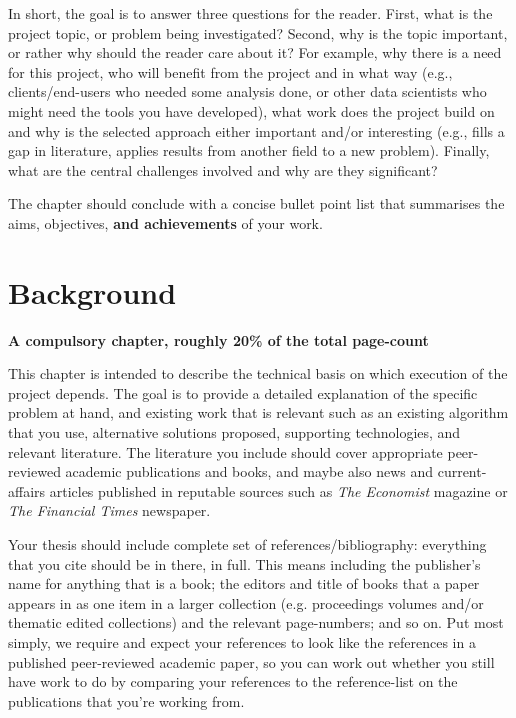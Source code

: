 \documentclass[ %
                    author={James Stephenson},
                supervisor={Dr. Edwin Simpson},
                    degree={MSc},
                     title={Bayesian Deep Learning For Extractive Test Summarisation},
                  subtitle={},
                      type={},
                      year={2023}]{dissertation}
\begin{document}
		In short, the goal is to answer three questions for the reader.  First, 
		what is the project topic, or problem being investigated?  Second, why 
		is the topic important, or rather why should the reader care about it?  
		For example, why there is a need for this project, who will benefit from the 
		project and in what way (e.g., clients/end-users who needed some analysis
		done, or other data scientists who might need the tools you have developed), what 
		work does the project build on and why is the selected approach either
		important and/or interesting (e.g., fills a gap in literature, applies
		results from another field to a new problem).  Finally, what are the 
		central challenges involved and why are they significant? 
		 
		The chapter should conclude with a concise bullet point list that 
		summarises the aims, objectives, {\bf and achievements}\/ of your work. 
		
	
	\chapter{Background}
	\label{chap:background}
		
		{\bf A compulsory chapter, roughly 20\% of the total page-count}
		\vspace{1cm} 
		
		\noindent
		This chapter is intended to describe the technical basis on which execution
		of the project depends.  The goal is to provide a detailed explanation of
		the specific problem at hand, and existing work that is relevant such as an
		existing algorithm that you use, alternative solutions proposed, supporting
		technologies, and relevant literature. The literature you include should cover 
		appropriate peer-reviewed academic publications and books, and maybe also 
		news and current-affairs articles published in reputable sources such as 
		{\em The Economist} magazine or {\em The Financial Times} newspaper. 
		
		Your thesis should include complete set of references/bibliography: everything that you cite should be in there, in full. This means including the publisher's name for anything that is a book; the editors and title of books that a paper appears in as one item in a larger collection (e.g. proceedings volumes and/or thematic edited collections) and the relevant page-numbers; and so on. Put most simply, we require and expect your references to look like the references in a published peer-reviewed academic paper, so you can work out whether you still have work to do by comparing your references to the reference-list on the publications that you're working from. 
		
\end{document}
